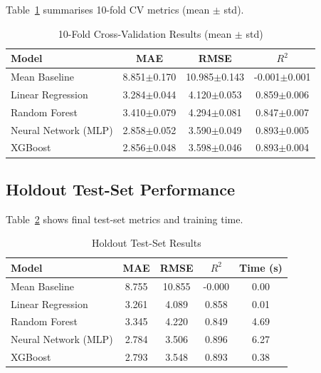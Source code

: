 \documentclass[conference]{IEEEtran}
\begin{document}
Table~\ref{tab:cv} summarises 10-fold CV metrics (mean $\pm$ std).

\begin{table}[H]
\centering
\caption{10-Fold Cross-Validation Results (mean $\pm$ std)}
\label{tab:cv}
\begin{tabular}{lccc}
\toprule
\textbf{Model} & \textbf{MAE} & \textbf{RMSE} & \textbf{$R^2$} \\
\midrule
        Mean Baseline & 8.851$\pm$0.170 & 10.985$\pm$0.143 & -0.001$\pm$0.001 \\
        Linear Regression & 3.284$\pm$0.044 & 4.120$\pm$0.053 & 0.859$\pm$0.006 \\
        Random Forest & 3.410$\pm$0.079 & 4.294$\pm$0.081 & 0.847$\pm$0.007 \\
        Neural Network (MLP) & 2.858$\pm$0.052 & 3.590$\pm$0.049 & 0.893$\pm$0.005 \\
        XGBoost & 2.856$\pm$0.048 & 3.598$\pm$0.046 & 0.893$\pm$0.004 \\
\bottomrule
\end{tabular}
\end{table}

\subsection{Holdout Test-Set Performance}

Table~\ref{tab:holdout} shows final test-set metrics and training time.

\begin{table}[H]
\centering
\caption{Holdout Test-Set Results}
\label{tab:holdout}
\begin{tabular}{lcccc}
\toprule
\textbf{Model} & \textbf{MAE} & \textbf{RMSE} & \textbf{$R^2$} & \textbf{Time (s)} \\
\midrule
        Mean Baseline & 8.755 & 10.855 & -0.000 & 0.00 \\
        Linear Regression & 3.261 & 4.089 & 0.858 & 0.01 \\
        Random Forest & 3.345 & 4.220 & 0.849 & 4.69 \\
        Neural Network (MLP) & 2.784 & 3.506 & 0.896 & 6.27 \\
        XGBoost & 2.793 & 3.548 & 0.893 & 0.38 \\
\bottomrule
\end{tabular}
\end{table}
\end{document}
